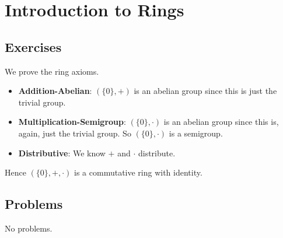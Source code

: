 \section{Introduction to Rings}
\subsection*{Exercises}
\begin{questions}
    \item We prove the ring axioms.
    \begin{itemize}
        \item \textbf{Addition-Abelian}: $(\{0\}, +)$ is an abelian group since this is just the trivial group.
        \item \textbf{Multiplication-Semigroup}: $(\{0\}, \cdot)$ is an abelian group since this is, again, just the trivial group. So $(\{0\}, \cdot)$ is a semigroup.
        \item \textbf{Distributive}: We know $+$ and $\cdot$ distribute.
    \end{itemize}
    Hence $(\{0\}, +, \cdot)$ is a commutative ring with identity.
\end{questions}

\subsection*{Problems}
No problems.
